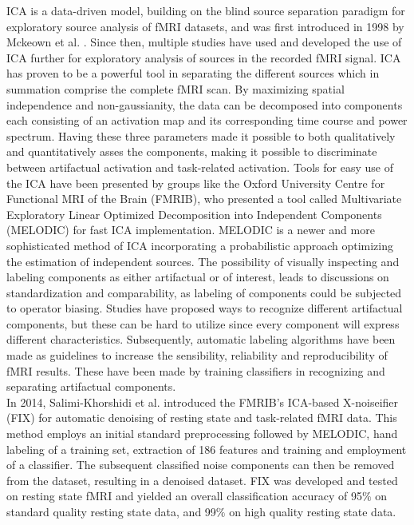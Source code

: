ICA is a data-driven model, building on the blind source separation paradigm for exploratory source analysis of fMRI datasets, and was first introduced in 1998 by Mckeown et al. \cite{Mckeown1998}. Since then, multiple studies \cite{Calhoun2001a,Deslauriers2017,Parkes2018,Du2018,Tohka2008} have used and developed the use of ICA further for exploratory analysis of sources in the recorded fMRI signal. ICA has proven to be a powerful tool in separating the different sources which in summation comprise the complete fMRI scan. By maximizing spatial independence and non-gaussianity, the data can be decomposed into components each consisting of an activation map and its corresponding time course and power spectrum. \cite{Salimi-Khorshidi2014} Having these three parameters made it possible to both qualitatively and quantitatively asses the components, making it possible to discriminate between artifactual activation and task-related activation. Tools for easy use of the ICA have been presented by groups like the Oxford University Centre for Functional MRI of the Brain (FMRIB), who presented a tool called Multivariate Exploratory Linear Optimized Decomposition into Independent Components (MELODIC) for fast ICA implementation. MELODIC is a newer and more sophisticated method of ICA incorporating a probabilistic approach optimizing the estimation of independent sources. \cite{FMRIB2016} The possibility of visually inspecting and labeling components as either artifactual or of interest, leads to discussions on standardization and comparability, as labeling of components could be subjected to operator biasing. Studies \cite{Salimi-Khorshidi2014,Griffanti2017} have proposed ways to recognize different artifactual components, but these can be hard to utilize since every component will express different characteristics. Subsequently, automatic labeling algorithms have been made as guidelines to increase the sensibility, reliability and reproducibility of fMRI results. These have been made by training classifiers in recognizing and separating artifactual components. \cite{Tohka2008} \\
In 2014, Salimi-Khorshidi et al. \cite{Salimi-Khorshidi2014} introduced the FMRIB's ICA-based X-noiseifier (FIX) for automatic denoising of resting state and task-related fMRI data. This method employs an initial standard preprocessing followed by MELODIC, hand labeling of a training set, extraction of 186 features and training and employment of a classifier. The subsequent classified noise components can then be removed from the dataset, resulting in a denoised dataset. FIX was developed and tested on resting state fMRI and yielded an overall classification accuracy of 95$\percent$ on standard quality resting state data, and 99$\percent$ on high quality resting state data. \cite{Salimi-Khorshidi2014}   \\
